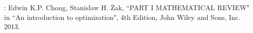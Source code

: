\documentclass[12pt,thmsa]{article}
\begin{document}


\bigskip

\noindent
[Ref]: Edwin K.P. Chong, Stanislaw H. Żak, ``PART I MATHEMATICAL REVIEW" in ``An introduction to optimization", 4th Edition, John Wiley and Sons, Inc. 2013.
\end{document}

